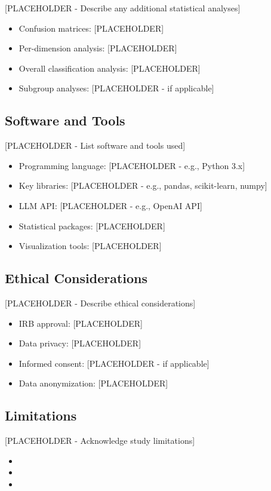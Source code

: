 \documentclass[12pt]{article}
\begin{document}
[PLACEHOLDER - Describe any additional statistical analyses]
\begin{itemize}
    \item Confusion matrices: [PLACEHOLDER]
    \item Per-dimension analysis: [PLACEHOLDER]
    \item Overall classification analysis: [PLACEHOLDER]
    \item Subgroup analyses: [PLACEHOLDER - if applicable]
\end{itemize}

\subsection{Software and Tools}

[PLACEHOLDER - List software and tools used]
\begin{itemize}
    \item Programming language: [PLACEHOLDER - e.g., Python 3.x]
    \item Key libraries: [PLACEHOLDER - e.g., pandas, scikit-learn, numpy]
    \item LLM API: [PLACEHOLDER - e.g., OpenAI API]
    \item Statistical packages: [PLACEHOLDER]
    \item Visualization tools: [PLACEHOLDER]
\end{itemize}

\subsection{Ethical Considerations}

[PLACEHOLDER - Describe ethical considerations]
\begin{itemize}
    \item IRB approval: [PLACEHOLDER]
    \item Data privacy: [PLACEHOLDER]
    \item Informed consent: [PLACEHOLDER - if applicable]
    \item Data anonymization: [PLACEHOLDER]
\end{itemize}

\subsection{Limitations}

[PLACEHOLDER - Acknowledge study limitations]
\begin{itemize}
    \item [PLACEHOLDER]
    \item [PLACEHOLDER]
    \item [PLACEHOLDER]
\end{itemize}
\end{document}
